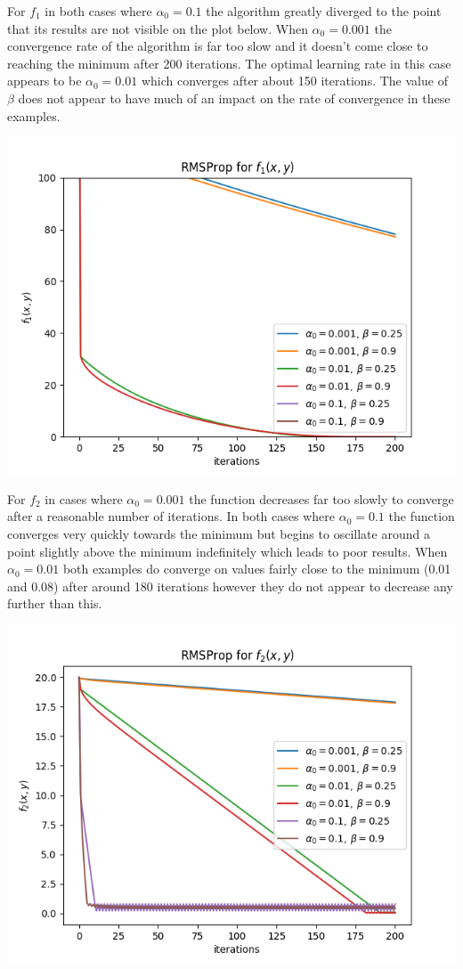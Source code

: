 \documentclass[12pt]{article}
\begin{document}
For $f_1$ in both cases where $\alpha_0=0.1$ the algorithm greatly diverged to the point that its results are not visible on the plot below. When $\alpha_0=0.001$ the convergence rate of the algorithm is far too slow and it doesn't come close to reaching the minimum after 200 iterations. The optimal learning rate in this case appears to be $\alpha_0=0.01$ which converges after about 150 iterations. The value of $\beta$ does not appear to have much of an impact on the rate of convergence in these examples.

\begin{center}
    \includegraphics[scale=0.6]{figs/b/b_i_1.png}
\end{center}

For $f_2$ in cases where $\alpha_0=0.001$ the function decreases far too slowly to converge after a reasonable number of iterations. In both cases where $\alpha_0=0.1$ the function converges very quickly towards the minimum but begins to oscillate around a point slightly above the minimum indefinitely which leads to poor results. When $\alpha_0=0.01$ both examples do converge on values fairly close to the minimum (0.01 and 0.08) after around 180 iterations however they do not appear to decrease any further than this.

\begin{center}
    \includegraphics[scale=0.6]{figs/b/b_i_2.png}
\end{center}
\end{document}
